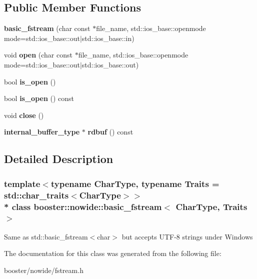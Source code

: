 \subsection*{Public Member Functions}
\begin{DoxyCompactItemize}
\item 
{\bfseries basic\+\_\+fstream} (char const $\ast$file\+\_\+name, std\+::ios\+\_\+base\+::openmode mode=std\+::ios\+\_\+base\+::out$\vert$std\+::ios\+\_\+base\+::in)\label{classbooster_1_1nowide_1_1basic__fstream_a19bf2f035f508e8912dd7ca2226aa3ac}

\item 
void {\bfseries open} (char const $\ast$file\+\_\+name, std\+::ios\+\_\+base\+::openmode mode=std\+::ios\+\_\+base\+::out$\vert$std\+::ios\+\_\+base\+::out)\label{classbooster_1_1nowide_1_1basic__fstream_a8bd6973e1d307904b913838db1601fe1}

\item 
bool {\bfseries is\+\_\+open} ()\label{classbooster_1_1nowide_1_1basic__fstream_aa935f6d90db9050d7d7d41ff92600495}

\item 
bool {\bfseries is\+\_\+open} () const \label{classbooster_1_1nowide_1_1basic__fstream_a51b8ed3cbf427146d8396c70a68726e8}

\item 
void {\bfseries close} ()\label{classbooster_1_1nowide_1_1basic__fstream_ad07239315e831d3be0d6468e6e1d964a}

\item 
{\bf internal\+\_\+buffer\+\_\+type} $\ast$ {\bfseries rdbuf} () const \label{classbooster_1_1nowide_1_1basic__fstream_ac60c9e9e38d4fbd030c30be89b5a1b62}

\end{DoxyCompactItemize}


\subsection{Detailed Description}
\subsubsection*{template$<$typename Char\+Type, typename Traits = std\+::char\+\_\+traits$<$\+Char\+Type$>$$>$\\*
class booster\+::nowide\+::basic\+\_\+fstream$<$ Char\+Type, Traits $>$}

Same as std\+::basic\+\_\+fstream$<$char$>$ but accepts U\+T\+F-\/8 strings under Windows 

The documentation for this class was generated from the following file\+:\begin{DoxyCompactItemize}
\item 
booster/nowide/fstream.\+h\end{DoxyCompactItemize}
